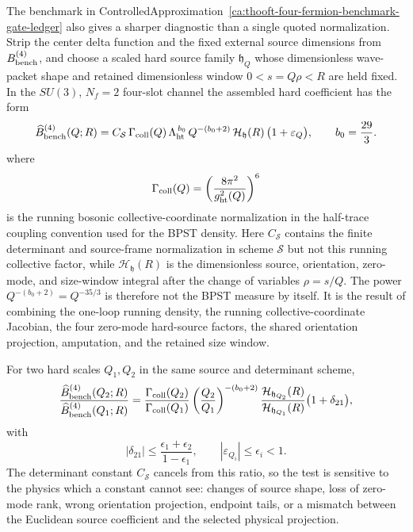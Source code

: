 \begin{controlledapproximation}
\label{ca:thooft-hard-scale-benchmark-ratio}
The benchmark in
ControlledApproximation~\ref{ca:thooft-four-fermion-benchmark-gate-ledger}
also gives a sharper diagnostic than a single quoted normalization.  Strip the
center delta function and the fixed external source dimensions from
\(B_{\rm bench}^{(4)}\), and choose a scaled hard source family
\(\mathfrak h_Q\) whose dimensionless wave-packet shape and retained
dimensionless window \(0<s=Q\rho<R\) are held fixed.  In the \(SU(3)\),
\(N_f=2\) four-slot channel the assembled hard coefficient has the form
\begin{equation}
  \widehat B_{\rm bench}^{(4)}(Q;R)
  =
  C_{\mathcal S}\,
  \Gamma_{\rm coll}(Q)\,
  \Lambda_{\rm ht}^{\,b_0}\,
  Q^{-(b_0+2)}\,
  \mathcal H_{\mathfrak h}(R)\,
  \bigl(1+\varepsilon_Q\bigr),
  \qquad b_0=\frac{29}{3}.
  \label{eq:thooft-hard-scale-benchmark-decomposition}
\end{equation}
where
\[
  \Gamma_{\rm coll}(Q)
  =
  \left(\frac{8\pi^2}{g_{\rm ht}^2(Q)}\right)^6
\]
is the running bosonic collective-coordinate normalization in the half-trace
coupling convention used for the BPST density.  Here \(C_{\mathcal S}\)
contains the finite determinant and source-frame normalization in scheme
\(\mathcal S\) but not this running collective factor, while
\(\mathcal H_{\mathfrak h}(R)\) is the dimensionless source, orientation,
zero-mode, and size-window integral after the change of variables
\(\rho=s/Q\).  The power \(Q^{-(b_0+2)}=Q^{-35/3}\) is therefore not the
BPST measure by itself.  It is the result of combining the one-loop running
density, the running collective-coordinate Jacobian, the four zero-mode
hard-source factors, the shared orientation projection, amputation, and the
retained size window.

For two hard scales \(Q_1,Q_2\) in the same source and determinant scheme,
\begin{equation}
  \frac{\widehat B_{\rm bench}^{(4)}(Q_2;R)}
       {\widehat B_{\rm bench}^{(4)}(Q_1;R)}
  =
  \frac{\Gamma_{\rm coll}(Q_2)}{\Gamma_{\rm coll}(Q_1)}
  \left(\frac{Q_2}{Q_1}\right)^{-(b_0+2)}
  \frac{\mathcal H_{\mathfrak h_{Q_2}}(R)}
       {\mathcal H_{\mathfrak h_{Q_1}}(R)}
  \bigl(1+\delta_{21}\bigr),
  \label{eq:thooft-hard-scale-benchmark-ratio}
\end{equation}
with
\begin{equation}
  |\delta_{21}|
  \le
  \frac{\epsilon_1+\epsilon_2}{1-\epsilon_1},
  \qquad |\varepsilon_{Q_i}|\le \epsilon_i<1 .
  \label{eq:thooft-hard-scale-ratio-residual}
\end{equation}
The determinant constant \(C_{\mathcal S}\) cancels from this ratio, so the
test is sensitive to the physics which a constant cannot see: changes of
source shape, loss of zero-mode rank, wrong orientation projection, endpoint
tails, or a mismatch between the Euclidean source coefficient and the selected
physical projection.


\end{controlledapproximation}
